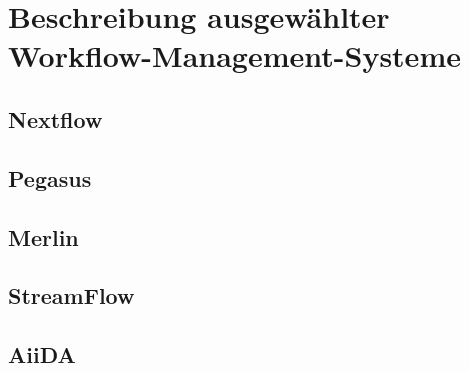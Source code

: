 %

\chapter{Beschreibung ausgewählter Workflow-Management-Systeme}
\label{sec:description}

\section{Nextflow}
\label{sec:description:nextflow}

\section{Pegasus}
\label{sec:description:pegasus}

\section{Merlin}
\label{sec:description:merlin}

\section{StreamFlow}
\label{sec:description:streamflow}

\section{AiiDA}
\label{sec:description:aiida}